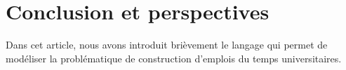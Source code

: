 \section{Conclusion et perspectives}
\label{sec:conclusion}
Dans cet article, nous avons introduit brièvement le langage \UTP{} qui permet de modéliser la problématique de construction d'emplois du temps universitaires.
%
